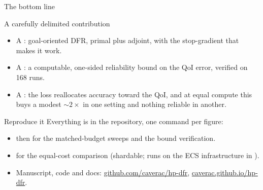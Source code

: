 \documentclass[11pt,aspectratio=169]{beamer}
\begin{document}
\begin{frame}{The bottom line}
  \begin{block}{A carefully delimited contribution}
    \begin{itemize}\itemsep0.4em
      \item A : goal-oriented DFR, primal plus adjoint, with the
            stop-gradient that makes it work.
      \item A : a computable, one-sided reliability bound on the
            QoI error, verified on 168 runs.
      \item A : the loss reallocates accuracy toward the QoI, and
            at equal compute this buys a modest $\sim\!2\times$ in one setting and
            nothing reliable in another.
    \end{itemize}
  \end{block}
  \medskip
  \centering
\end{frame}

\begin{frame}{Reproduce it}
  Everything is in the repository, one command per figure:
  \medskip
  \begin{itemize}\itemsep0.5em
    \item {} then  for the
          matched-budget sweeps and the bound verification.
    \item {} for the equal-cost comparison
          (shardable; runs on the ECS infrastructure in ).
    \item Manuscript, code and docs:
          \href{https://github.com/caverac/hp-dfr}{github.com/caverac/hp-dfr},
          \href{https://caverac.github.io/hp-dfr/}{caverac.github.io/hp-dfr}.
  \end{itemize}
  \vfill
  \centering
\end{frame}
\end{document}
